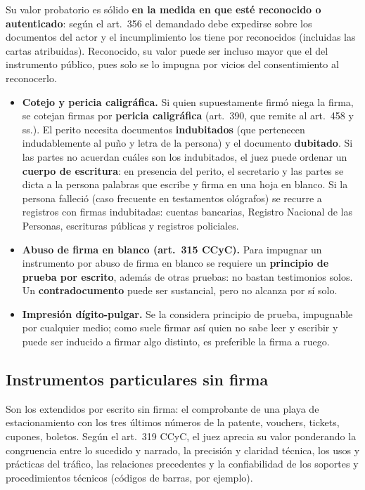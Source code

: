 \documentclass[12pt,oneside]{book}
\begin{document}
Su valor probatorio es sólido \textbf{en la medida en que esté reconocido o autenticado}: según el art.~356 el demandado debe expedirse sobre los documentos del actor y el incumplimiento los tiene por reconocidos (incluidas las cartas atribuidas). Reconocido, su valor puede ser incluso mayor que el del instrumento público, pues solo se lo impugna por vicios del consentimiento al reconocerlo.

\begin{itemize}
\item \textbf{Cotejo y pericia caligráfica.} Si quien supuestamente firmó niega la firma, se cotejan firmas por \textbf{pericia caligráfica} (art.~390, que remite al art.~458 y ss.). El perito necesita documentos \textbf{indubitados} (que pertenecen indudablemente al puño y letra de la persona) y el documento \textbf{dubitado}. Si las partes no acuerdan cuáles son los indubitados, el juez puede ordenar un \textbf{cuerpo de escritura}: en presencia del perito, el secretario y las partes se dicta a la persona palabras que escribe y firma en una hoja en blanco. Si la persona falleció (caso frecuente en testamentos ológrafos) se recurre a registros con firmas indubitadas: cuentas bancarias, Registro Nacional de las Personas, escrituras públicas y registros policiales.
\item \textbf{Abuso de firma en blanco (art.~315 CCyC).} Para impugnar un instrumento por abuso de firma en blanco se requiere un \textbf{principio de prueba por escrito}, además de otras pruebas: no bastan testimonios solos. Un \textbf{contradocumento} puede ser sustancial, pero no alcanza por sí solo.
\item \textbf{Impresión dígito-pulgar.} Se la considera principio de prueba, impugnable por cualquier medio; como suele firmar así quien no sabe leer y escribir y puede ser inducido a firmar algo distinto, es preferible la firma a ruego.
\end{itemize}

\subsection{Instrumentos particulares sin firma}

Son los extendidos por escrito sin firma: el comprobante de una playa de estacionamiento con los tres últimos números de la patente, vouchers, tickets, cupones, boletos. Según el art.~319 CCyC, el juez aprecia su valor ponderando la congruencia entre lo sucedido y narrado, la precisión y claridad técnica, los usos y prácticas del tráfico, las relaciones precedentes y la confiabilidad de los soportes y procedimientos técnicos (códigos de barras, por ejemplo). %
\end{document}
